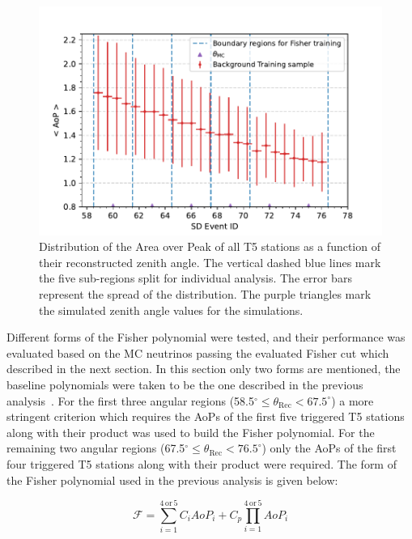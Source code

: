 \begin{figure}[h!]
  \centering
  \includegraphics[width=\textwidth]{thesis_figures/Nu_analysis/Selection_AoP_theta_wnt_redcut.pdf}
  \caption{Distribution of the Area over Peak of all T5 stations as a function of their reconstructed zenith angle. The vertical dashed blue lines mark the five sub-regions split for individual analysis. The error bars represent the spread of the distribution. The purple triangles mark the simulated zenith angle values for the simulations.}
  \label{fig:AoP_v_theta}
\end{figure}

Different forms of the Fisher polynomial were tested, and their performance was evaluated based on the MC neutrinos passing the evaluated Fisher cut which described in the next section. In this section only two forms are mentioned, the baseline polynomials were taken to be the one described in the previous analysis~\cite{gap_note_2013}. For the first three angular regions (58.5$^\circ \leq \theta_{\text{Rec}} < 67.5^\circ$) a more stringent criterion which requires the AoPs of the first five triggered T5 stations along with their product was used to build the Fisher polynomial. For the remaining two angular regions (67.5$^\circ \leq \theta_{\text{Rec}} < 76.5^\circ$) only the AoPs of the first four triggered T5 stations along with their product were required. The form of the Fisher polynomial used in the previous analysis is given below:

\begin{equation}
  \mathcal{F} = \sum_{i=1}^{4\,\text{or}\,5} C_i AoP_i + C_p \prod_{i=1}^{4\,\text{or}\,5} AoP_i
\end{equation}

